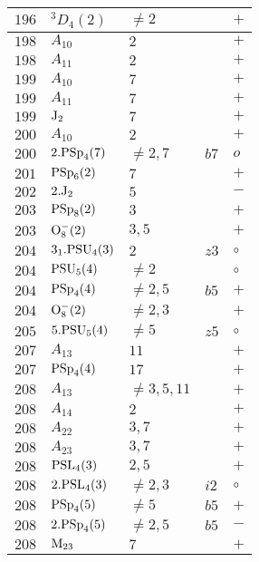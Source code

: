 \documentclass[a4paper, 11pt]{article}
\begin{document}
\begin{longtable}{lllll}
		$196$ & ${}^{3}D_{4}(2)$ & $\neq 2$ &  & $+$ \\ \hline
		$198$ & $A_{10}$ & $2$ &  & $+$ \\ \hline
		$198$ & $A_{11}$ & $2$ &  & $+$ \\ \hline
		$199$ & $A_{10}$ & $7$ &  & $+$ \\ \hline
		$199$ & $A_{11}$ & $7$ &  & $+$ \\ \hline
		$199$ & ${\rm J}_2$ & $7$ &  & $+$ \\ \hline
		$200$ & $A_{10}$ & $2$ &  & $+$ \\ \hline
		$200$ & $2.{\rm PSp}_{4}(7)$ & $\neq 2,7$ & $b7$ & $o$ \\ \hline
		$201$ & ${\rm PSp}_{6}(2)$ & $7$ &  & $+$ \\ \hline
		$202$ & $2.{\rm J}_2$ & $5$ &  & $-$ \\ \hline
		$203$ & ${\rm PSp}_{8}(2)$ & $3$ &  & $+$ \\ \hline
		$203$ & ${\rm O}_{8}^-(2)$ & $3, 5$ &  & $+$ \\ \hline
		$204$ & $3_1.{\rm PSU}_{4}(3)$ & $2$ & $z3$ & $\circ$ \\ \hline
		$204$ & ${\rm PSU}_{5}(4)$ & $\neq 2$ &  & $\circ$ \\ \hline
		$204$ & ${\rm PSp}_{4}(4)$ & $\neq 2,5$ & $b5$ & $+$ \\ \hline
		$204$ & ${\rm O}_{8}^-(2)$ & $\neq 2,3$ &  & $+$ \\ \hline
		$205$ & $5.{\rm PSU}_{5}(4)$ & $\neq 5$ & $z5$ & $\circ$ \\ \hline
		$207$ & $A_{13}$ & $11$ &  & $+$ \\ \hline
		$207$ & ${\rm PSp}_{4}(4)$ & $17$ &  & $+$ \\ \hline
		$208$ & $A_{13}$ & $\neq 3,5,11$ &  & $+$ \\ \hline
		$208$ & $A_{14}$ & $2$ &  & $+$ \\ \hline
		$208$ & $A_{22}$ & $3,7$ &  & $+$ \\ \hline
		$208$ & $A_{23}$ & $3,7$ &  & $+$ \\ \hline
		$208$ & ${\rm PSL}_{4}(3)$ & $2,5$ &  & $+$ \\ \hline
		$208$ & $2.{\rm PSL}_{4}(3)$ & $\neq 2,3$ & $i2$ & $\circ$ \\ \hline
		$208$ & ${\rm PSp}_{4}(5)$ & $\neq 5$ & $b5$ & $+$ \\ \hline
		$208$ & $2.{\rm PSp}_{4}(5)$ & $\neq 2,5$ & $b5$ & $-$ \\ \hline
		$208$ & ${\rm M}_{23}$ & $7$ &  & $+$ \\ \hline

\end{longtable}
\end{document}
